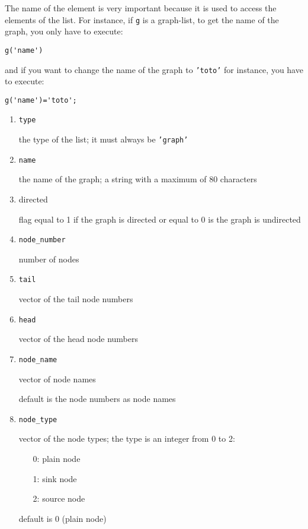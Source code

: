 \documentclass[11pt]{report}
\newcommand{\T}[1]{{\tt #1}}
\begin{document}
The name of the element is very important because it is used to access 
the elements
of the list. For instance, if \T{g} is a graph-list, to get the name
of the graph, you only have to execute:
\begin{verbatim}
g('name')
\end{verbatim}

and if you want to change the name of the graph to \T{'toto'} for
instance, you have to execute: 
\begin{verbatim}
g('name')='toto';
\end{verbatim}

\begin{enumerate}
  \item \T{type}

the type of the list; it must always be \T{'graph'}

  \item \T{name} 

the name of the graph; a string with a maximum of 80 characters

  \item directed 

flag equal to 1 if the graph is directed or equal to 0 is the graph is
undirected 

  \item \T{node\_number}

number of nodes

  \item \T{tail}

vector of the tail node numbers

  \item \T{head}

vector of the head node numbers

  \item \T{node\_name}

vector of node names

default is the node numbers as node names

  \item \T{node\_type}

vector of the node types; the type is an integer from 0 to 2:
\begin{itemize}
  \item[0:] plain node
  \item[1:] sink node
  \item[2:] source node
\end{itemize}


default is 0 (plain node)


\end{enumerate}
\end{document}
